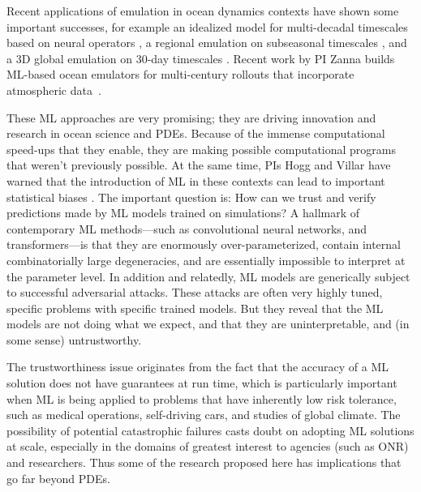 \documentclass[11pt]{article}
\begin{document}
Recent applications of emulation in ocean dynamics contexts have shown some important successes, for example
an idealized model for multi-decadal timescales based on neural operators \cite{bire2023ocean}, a regional emulation on subseasonal timescales 
\cite{chattopadhyay2023oceannet}, and a 3D global emulation on 30-day timescales
\cite{xiong2023ai}.
Recent work by PI Zanna builds ML-based ocean emulators for multi-century rollouts that incorporate atmospheric data~\cite{subel2024building, thermalizer}. 

These ML approaches are very promising; they are driving innovation and research in ocean science and PDEs.
Because of the immense computational speed-ups that they enable, they are making possible computational programs that weren't previously possible.
At the same time, PIs Hogg and Villar have warned that the introduction of ML in these contexts can lead to important statistical biases \cite{goodorbad}.
The important question is: How can we trust and verify predictions made by ML models trained on simulations?
A hallmark of contemporary ML methods---such as convolutional neural networks, and transformers---is that they are enormously over-parameterized, contain internal combinatorially large degeneracies, and are essentially impossible to interpret at the parameter level.
In addition and relatedly, ML models are generically subject to successful adversarial attacks.
These attacks are often very highly tuned, specific problems with specific trained models.
But they reveal that the ML models are not doing what we expect, and that they are uninterpretable, and (in some sense) untrustworthy.

The trustworthiness issue originates from the fact that the accuracy of a ML solution does not have guarantees at run time, which is particularly important when ML is being applied to problems that have inherently low risk tolerance, such as medical operations, self-driving cars, and studies of global climate.
The possibility of potential catastrophic failures casts doubt on adopting ML solutions at scale, especially in the domains of greatest interest to agencies (such as ONR) and researchers.
Thus some of the research proposed here has implications that go far beyond PDEs.
\end{document}

